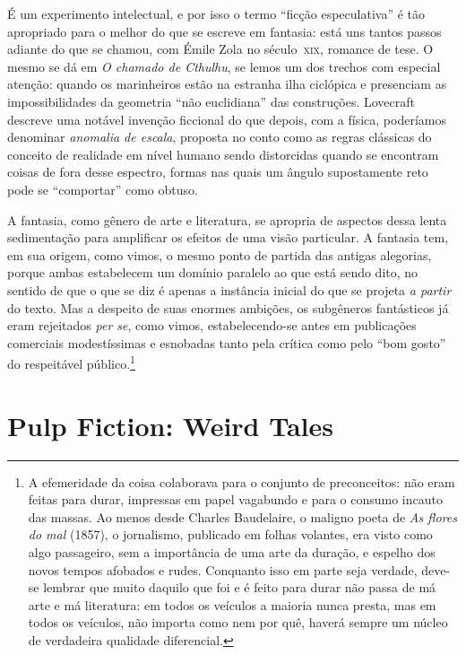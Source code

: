 É um experimento intelectual, e por isso o termo ``ficção
especulativa'' é tão apropriado para o melhor do que se escreve em
fantasia: está uns tantos passos adiante do que se chamou, com Émile
Zola no século~\textsc{xix}, romance de tese. O mesmo se dá em \emph{O chamado
de Cthulhu}, se lemos um dos trechos com especial atenção: quando os marinheiros estão na estranha ilha ciclópica e presenciam as
impossibilidades da geometria ``não euclidiana'' das construções.
Lovecraft descreve uma notável invenção ficcional do que depois, com a
física, poderíamos denominar \emph{anomalia de escala}, proposta no
conto como as regras clássicas do conceito de realidade em nível humano
sendo distorcidas quando se encontram coisas de fora desse espectro,
formas nas quais um ângulo supostamente reto pode se ``comportar'' como
obtuso.

A fantasia, como gênero de arte e literatura, se apropria de aspectos
dessa lenta sedimentação para amplificar os efeitos de uma visão
particular. A fantasia tem, em sua origem, como vimos, o mesmo ponto de
partida das antigas alegorias, porque ambas estabelecem um domínio
paralelo ao que está sendo dito, no sentido de que o que se diz é apenas
a instância inicial do que se projeta \emph{a partir} do texto. Mas a
despeito de suas enormes ambições, os subgêneros fantásticos já eram
rejeitados \emph{per se}, como vimos, estabelecendo-se antes em
publicações comerciais modestíssimas e esnobadas tanto pela crítica como
pelo ``bom gosto'' do respeitável público.\footnote{A efemeridade da
  coisa colaborava para o conjunto de preconceitos: não eram feitas para
  durar, impressas em papel vagabundo e para o consumo incauto das
  massas. Ao menos desde Charles Baudelaire, o maligno poeta
  de \emph{As flores do mal} (1857), o jornalismo, publicado em folhas volantes,
  era visto como algo passageiro, sem a importância de uma arte da
  duração, e espelho dos novos tempos afobados e rudes. Conquanto isso
  em parte seja verdade, deve-se lembrar que muito daquilo que foi e é
  feito para durar não passa de má arte e má literatura: em todos os
  veículos a maioria nunca presta, mas em todos os veículos, não importa
  como nem por quê, haverá sempre um núcleo de verdadeira qualidade
  diferencial.}

\section{Pulp Fiction: Weird Tales}

